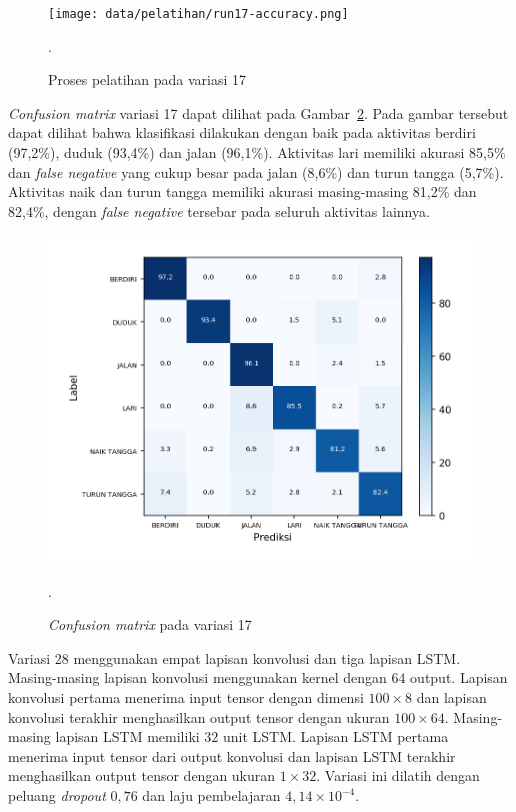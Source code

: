\begin{figure}[h!]
    \centering
    \texttt{[image: data/pelatihan/run17-accuracy.png]}
    \caption{Proses pelatihan pada variasi 17}.
    \label{gambar:run17-training}
\end{figure}

\textit{Confusion matrix} variasi 17 dapat dilihat pada Gambar~\ref{gambar:run17-confusion-martix}. Pada gambar tersebut dapat dilihat bahwa klasifikasi dilakukan dengan baik pada aktivitas berdiri (97,2\%), duduk (93,4\%) dan jalan (96,1\%). Aktivitas lari memiliki akurasi 85,5\% dan \textit{false negative} yang cukup besar pada jalan (8,6\%) dan turun tangga (5,7\%). Aktivitas naik dan turun tangga memiliki akurasi masing-masing 81,2\% dan 82,4\%, dengan \textit{false negative} tersebar pada seluruh aktivitas lainnya.

\begin{figure}[h!]
    \centering
    \includegraphics[width=13cm]{gambar/hasil-pembahasan/run17-confusion-matrix.png}
    \caption{\textit{Confusion matrix} pada variasi 17}.
    \label{gambar:run17-confusion-martix}
\end{figure}

Variasi 28 menggunakan empat lapisan konvolusi dan tiga lapisan LSTM\@. Masing-masing lapisan konvolusi menggunakan kernel dengan $64$ output. Lapisan konvolusi pertama menerima input tensor dengan dimensi $100 \times 8$ dan lapisan konvolusi terakhir menghasilkan output tensor dengan ukuran $100 \times 64$. Masing-masing lapisan LSTM memiliki $32$ unit LSTM\@. Lapisan LSTM pertama menerima input tensor dari output konvolusi dan lapisan LSTM terakhir menghasilkan output tensor dengan ukuran $1 \times 32$. Variasi ini dilatih dengan peluang \textit{dropout} $0,76$ dan laju pembelajaran $4,14 \times 10^{-4}$.

